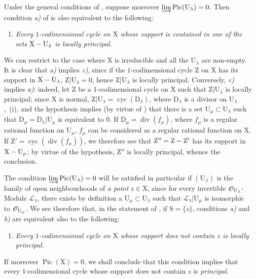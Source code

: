 \begin{remark}[21.13.16]
\label{IV.21.13.16}
Under the general conditions of , suppose moreover $\varinjlim\operatorname{Pic}(\mathrm{U}_\lambda)=0$.
Then condition \emph{a)} of  is also equivalent to the following:
\begin{enumerate}
  \item[c)] \emph{Every $1$-codimensional cycle on $\mathrm{X}$ whose support is contained in one of the sets $\mathrm{X}-\mathrm{U}_\lambda$ is locally principal.}
\end{enumerate}

We can restrict to the case where $\mathrm{X}$ is irreducible and all the $\mathrm{U}_\lambda$ are non-empty.
It is clear that \emph{a)} implies \emph{c)}, since if the $1$-codimensional cycle $\mathrm{Z}$ on $\mathrm{X}$ has its support in $\mathrm{X}-\mathrm{U}_\lambda$, $\mathrm{Z}|\mathrm{U}_\lambda=0$, hence $\mathrm{Z}|\mathrm{U}_\lambda$ is locally principal.
Conversely, \emph{c)} implies \emph{a)}: indeed, let $\mathrm{Z}$ be a $1$-codimensional cycle on $\mathrm{X}$ such that $\mathrm{Z}|\mathrm{U}_\lambda$ is locally principal; since $\mathrm{X}$ is normal, $\mathrm{Z}|\mathrm{U}_\lambda=\operatorname{cyc}(\mathrm{D}_\lambda)$, where $\mathrm{D}_\lambda$ is a divisor on $\mathrm{U}_\lambda$ ,{}~(i), and the hypothesis implies (by virtue of ) that there is a set $\mathrm{U}_\mu\subset\mathrm{U}_\lambda$ such that $\mathrm{D}_\mu=\mathrm{D}_\lambda|\mathrm{U}_\mu$ is equivalent to $0$.
If $\mathrm{D}_\mu=\operatorname{div}(f_\mu)$, where $f_\mu$ is a regular rational function on $\mathrm{U}_\mu$, $f_\mu$ can be considered as a regular rational function on $\mathrm{X}$. If $\mathrm{Z}'=\operatorname{cyc}(\operatorname{div}(f_\mu))$, we therefore see that $\mathrm{Z}''=\mathrm{Z}-\mathrm{Z}'$ has its support in $\mathrm{X}-\mathrm{U}_\mu$; by virtue of the hypothesis, $\mathrm{Z}''$ is locally principal, whence the conclusion.

The condition $\varinjlim\operatorname{Pic}(\mathrm{U}_\lambda)=0$ will be satisfied in particular if $(\mathrm{U}_\lambda)$ is the family of open neighbourhoods of \emph{a point} $z\in\mathrm{X}$, since for every invertible $\mathscr{O}_{\mathrm{U}_\lambda}$-Module $\mathscr{L}_\lambda$, there exists by definition a $\mathrm{U}_\mu\subset\mathrm{U}_\lambda$ such that $\mathscr{L}_\lambda|\mathrm{U}_\mu$ is isomorphic to $\mathscr{O}_{\mathrm{U}_\mu}$.
We see therefore that, in the statement of , if $\mathrm{S}=\{z\}$, conditions \emph{a)} and \emph{b)} are equivalent also to the following:
\begin{enumerate}
  \item[c)] \emph{Every $1$-codimensional cycle on $\mathrm{X}$ whose support does not contain $z$ is locally principal.}
\end{enumerate}

If moreover $\operatorname{Pic}(\mathrm{X})=0$, we shall conclude that this condition implies that every $1$-codimensional cycle whose support does not contain $z$ is \emph{principal}.
\end{remark}

